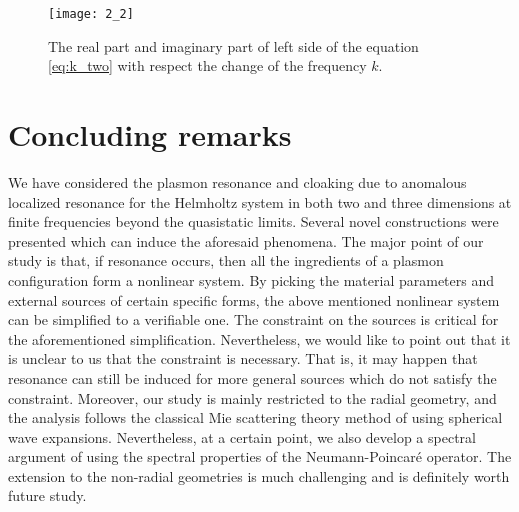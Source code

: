 \documentclass[11pt,reqno,twoside]{amsart}
\theoremstyle{definition}
\theoremstyle{remark}
\newtheorem{rem}{Remark}[section]
\numberwithin{equation}{section}
\begin{document}
\begin{figure}[t]
  \centering
 {\texttt{[image: 2\_2]}}
  \caption{The real part and imaginary part of left side of  the equation  \eqref{eq:k_two} with respect the change of the frequency $k$. }
  \label{fig:7}
\end{figure}
%
%

\section{Concluding remarks}

We have considered the plasmon resonance and cloaking due to anomalous localized resonance for the Helmholtz system in both two and three dimensions at finite frequencies beyond the quasistatic limits. Several novel constructions were presented which can induce the aforesaid phenomena. The major point of our study is that, if resonance occurs, then all the ingredients of a plasmon configuration form a nonlinear system. By picking the material parameters and external sources of certain specific forms, the above mentioned nonlinear system can be simplified to a verifiable one. The constraint on the sources is critical for the aforementioned simplification. Nevertheless, we would like to point out that it is unclear to us that the constraint is necessary. That is, it may happen that resonance can still be induced for more general sources which do not satisfy the constraint. Moreover, our study is mainly restricted to the radial geometry, and the analysis follows the classical Mie scattering theory method of using spherical wave expansions. Nevertheless, at a certain point, we also develop a spectral argument of using the spectral properties of the Neumann-Poincar\'e operator. The extension to the non-radial geometries is much challenging and is definitely worth future study. 
\end{document}
